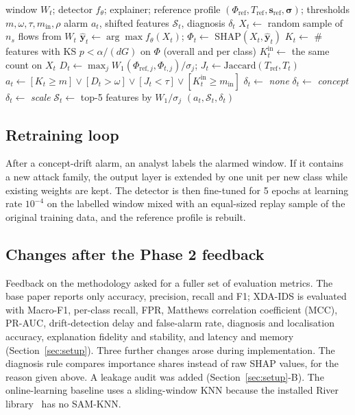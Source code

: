 \documentclass[conference]{IEEEtran}
\begin{document}
\begin{algorithm}[t]
\caption{SHAP-drift monitoring of one window}
\label{alg:monitor}
\small
\begin{algorithmic}[1]
\Require window $W_t$; detector $f_\theta$; explainer; reference profile $(\Phi_{\text{ref}},T_{\text{ref}},\mathbf{s}_{\text{ref}},\boldsymbol\sigma)$; thresholds $m,\omega,\tau,m_{\text{in}},\rho$
\Ensure alarm $a_t$, shifted features $\mathcal{S}_t$, diagnosis $\delta_t$
\State $X_t \gets$ random sample of $n_s$ flows from $W_t$
\State $\hat{\mathbf{y}}_t \gets \arg\max f_\theta(X_t)$; \quad $\Phi_t \gets$ SHAP$(X_t,\hat{\mathbf{y}}_t)$
\State $K_t \gets$ \# features with KS $p<\alpha/(dG)$ on $\Phi$ (overall and per class)
\State $K^{\text{in}}_t \gets$ the same count on $X_t$
\State $D_t \gets \max_j W_1(\Phi_{\text{ref},j},\Phi_{t,j})/\sigma_j$; \quad $J_t \gets \text{Jaccard}(T_{\text{ref}},T_t)$
\State $a_t \gets [K_t\ge m]\lor[D_t>\omega]\lor[J_t<\tau]\lor[K^{\text{in}}_t\ge m_{\text{in}}]$
 \State $\delta_t\gets$ \textit{none}
 \State $\delta_t\gets$ \textit{concept} 
\Else \State $\delta_t\gets$ \textit{scale} 
\EndIf
\State $\mathcal{S}_t\gets$ top-5 features by $W_1/\sigma_j$
\State \Return $(a_t,\mathcal{S}_t,\delta_t)$
\end{algorithmic}
\end{algorithm}

\subsection{Retraining loop}
After a concept-drift alarm, an analyst labels the alarmed window. If it contains a new attack family, the output layer is extended by one unit per new class while existing weights are kept. The detector is then fine-tuned for 5 epochs at learning rate $10^{-4}$ on the labelled window mixed with an equal-sized replay sample of the original training data, and the reference profile is rebuilt.

\subsection{Changes after the Phase 2 feedback}
Feedback on the methodology asked for a fuller set of evaluation metrics. The base paper reports only accuracy, precision, recall and F1; XDA-IDS is evaluated with Macro-F1, per-class recall, FPR, Matthews correlation coefficient (MCC), PR-AUC, drift-detection delay and false-alarm rate, diagnosis and localisation accuracy, explanation fidelity and stability, and latency and memory (Section~\ref{sec:setup}). Three further changes arose during implementation. The diagnosis rule compares importance shares instead of raw SHAP values, for the reason given above. A leakage audit was added (Section~\ref{sec:setup}-B). The online-learning baseline uses a sliding-window KNN because the installed River library~\cite{montiel2021} has no SAM-KNN.
\end{document}
